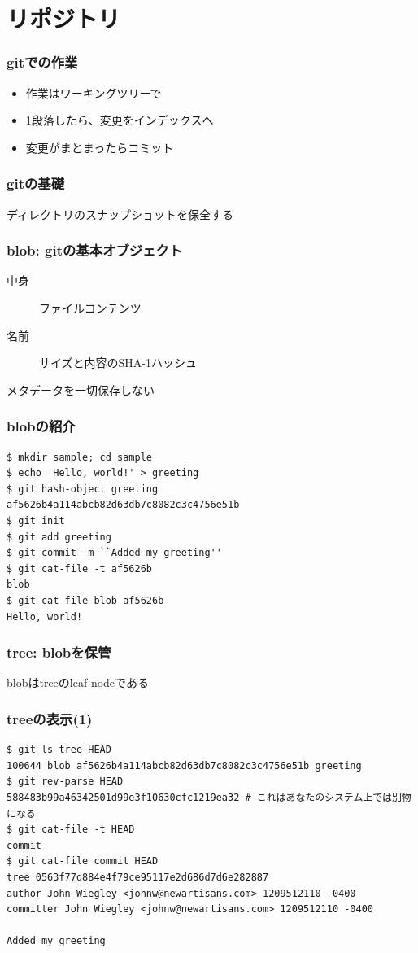 \section{リポジトリ}

\begin{frame}
  \frametitle{gitでの作業}
  \begin{itemize}
  \item 作業はワーキングツリーで
  \item 1段落したら、変更をインデックスへ
  \item 変更がまとまったらコミット
  \end{itemize}
\end{frame}

\begin{frame}
  \frametitle{gitの基礎}
  \begin{alertblock}{}
    ディレクトリのスナップショットを保全する
  \end{alertblock}
\end{frame}

\begin{frame}
  \frametitle{blob: gitの基本オブジェクト}
  \begin{description}
  \item[中身] ファイルコンテンツ
  \item[名前] サイズと内容のSHA-1ハッシュ
  \end{description}
  \begin{alertblock}{}
    メタデータを一切保存しない
  \end{alertblock}
\end{frame}

\begin{frame}[fragile]
  \frametitle{blobの紹介}
\begin{lstlisting}
$ mkdir sample; cd sample
$ echo 'Hello, world!' > greeting 
$ git hash-object greeting
af5626b4a114abcb82d63db7c8082c3c4756e51b
$ git init
$ git add greeting
$ git commit -m ``Added my greeting''
$ git cat-file -t af5626b
blob
$ git cat-file blob af5626b
Hello, world!
\end{lstlisting}
\end{frame}

\begin{frame}
  \frametitle{tree: blobを保管}
  \begin{block}{}
    blobはtreeのleaf-nodeである
  \end{block}
\end{frame}

\begin{frame}[fragile]
  \frametitle{treeの表示(1)}
  \begin{lstlisting}
$ git ls-tree HEAD
100644 blob af5626b4a114abcb82d63db7c8082c3c4756e51b greeting
$ git rev-parse HEAD
588483b99a46342501d99e3f10630cfc1219ea32 # これはあなたのシステム上では別物になる
$ git cat-file -t HEAD
commit
$ git cat-file commit HEAD
tree 0563f77d884e4f79ce95117e2d686d7d6e282887
author John Wiegley <johnw@newartisans.com> 1209512110 -0400
committer John Wiegley <johnw@newartisans.com> 1209512110 -0400

Added my greeting 
\end{lstlisting}
\end{frame}

